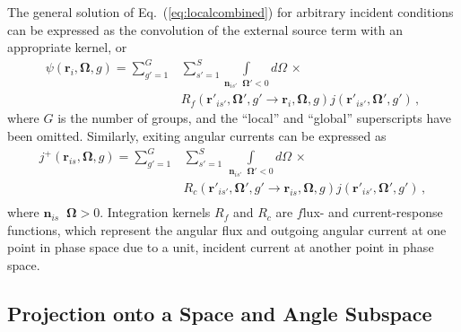 \documentclass[5p,times,twocolumn,10pt]{elsarticle}
\newcommand{\EQ}[1]{Eq.~(\ref{#1})}               %
\DeclareMathOperator*{\dotp}{{\scriptscriptstyle \stackrel{\bullet}{{}}}}
\begin{document}
    The general solution of \EQ{eq:localcombined} for arbitrary incident 
    conditions can be expressed as the convolution of the external source 
    term with an appropriate kernel, or
    \begin{equation}
        \begin{split}
            \psi(\mathbf{r}_i, \bm{\Omega},g) =   
            \sum^{G}_{g'=1} &  \sum^{S}_{s'=1}  
            \int\limits_{\mathbf{n}_{is'} \dotp \bm{\Omega}' < 0} d\Omega \, 
            \times \\ 
            & R_{f}(\mathbf{r}'_{is'},\bm{\Omega}',g' \rightarrow 
            \mathbf{r}_i,\bm{\Omega},g)        
            j (\mathbf{r}'_{is'},\bm{\Omega}', g')  \, ,             
        \end{split}           
        \label{eq:localflux}
    \end{equation}
    where $G$ is the number of groups, and the ``local'' and ``global'' 
    superscripts have been omitted. Similarly, exiting angular currents can 
    be expressed as 
    \begin{equation}
        \begin{split}
            j^+(\mathbf{r}_{is},\bm{\Omega},g) =   
            \sum^{G}_{g'=1} &  \sum^{S}_{s'=1}  \,
            \int\limits_{\mathbf{n}_{is'} \dotp \bm{\Omega}' < 0} d\Omega \, 
            \times \\
            & R_{c}(\mathbf{r}'_{is'},\bm{\Omega}' ,g' \rightarrow 
            \mathbf{r}_{is},\bm{\Omega},g)        
            j (\mathbf{r}'_{is'},\bm{\Omega}', g')  \, , \\
        \end{split}   
        \label{eq:localj}
    \end{equation}
    where $\mathbf{n}_{is} \dotp \bm{\Omega} > 0$. Integration kernels $R_{f}$ 
    and $R_{c}$ are $f$lux- and $c$urrent-response functions, which 
    represent the angular flux and outgoing angular current at one point in 
    phase space due to a unit, incident current at another point in phase space.
    
    \subsection{Projection onto a Space and Angle Subspace}
    
\end{document}

